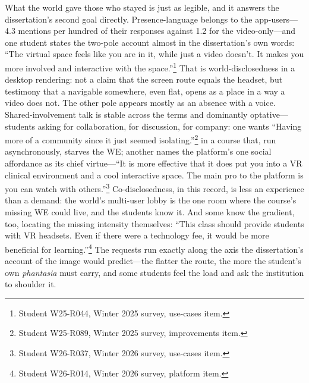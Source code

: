 What the world gave those who stayed is just as legible, and it answers the dissertation's second goal directly. Presence-language belongs to the app-users---4.3 mentions per hundred of their responses against 1.2 for the video-only---and one student states the two-pole account almost in the dissertation's own words: ``The virtual space feels like you are in it, while just a video doesn't. It makes you more involved and interactive with the space.''\footnote{Student W25-R044, Winter 2025 survey, use-cases item.} That is world-disclosedness in a desktop rendering: not a claim that the screen route equals the headset, but testimony that a navigable somewhere, even flat, opens as a place in a way a video does not. The other pole appears mostly as an absence with a voice. Shared-involvement talk is stable across the terms and dominantly optative---students asking for collaboration, for discussion, for company: one wants ``Having more of a community since it just seemed isolating.''\footnote{Student W25-R089, Winter 2025 survey, improvements item.} in a course that, run asynchronously, starves the WE; another names the platform's one social affordance as its chief virtue---``It is more effective that it does put you into a VR clinical environment and a cool interactive space. The main pro to the platform is you can watch with others.''\footnote{Student W26-R037, Winter 2026 survey, use-cases item.} Co-disclosedness, in this record, is less an experience than a demand: the world's multi-user lobby is the one room where the course's missing WE could live, and the students know it. And some know the gradient, too, locating the missing intensity themselves: ``This class should provide students with VR headsets. Even if there were a technology fee, it would be more beneficial for learning.''\footnote{Student W26-R014, Winter 2026 survey, platform item.} The requests run exactly along the axis the dissertation's account of the image would predict---the flatter the route, the more the student's own \textit{phantasia} must carry, and some students feel the load and ask the institution to shoulder it.

